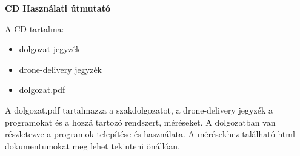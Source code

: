 \pagestyle{empty}

\noindent \textbf{\Large CD Használati útmutató}
%
%
%


A CD tartalma:
\begin{itemize}
    \item dolgozat jegyzék
    \item drone-delivery jegyzék
    \item dolgozat.pdf
\end{itemize}
A dolgozat.pdf tartalmazza a szakdolgozatot, a drone-delivery jegyzék a programokat és a hozzá tartozó rendszert, méréseket.
A dolgozatban van részletezve a programok telepítése és használata.
A mérésekhez található html dokumentumokat meg lehet tekinteni önállóan.

